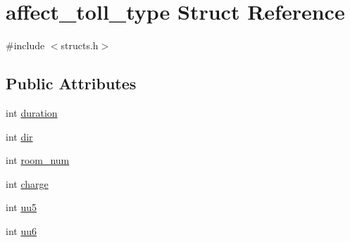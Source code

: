 \hypertarget{structaffect__toll__type}{\section{affect\-\_\-toll\-\_\-type Struct Reference}
\label{structaffect__toll__type}
}


{\ttfamily \#include $<$structs.\-h$>$}

\subsection*{Public Attributes}
\begin{DoxyCompactItemize}
\item 
int \hyperlink{structaffect__toll__type_a7159461554549737b4fcc69d0c99bee6}{duration}
\item 
int \hyperlink{structaffect__toll__type_a9c441d78d4dafead32c1643d3c34887b}{dir}
\item 
int \hyperlink{structaffect__toll__type_a02094b865c39de6b81e98aac186274de}{room\-\_\-num}
\item 
int \hyperlink{structaffect__toll__type_ae30589b5d098548aaeac661c8e5ae3c7}{charge}
\item 
int \hyperlink{structaffect__toll__type_a7e7d65bb8bcd4df59122856581860280}{uu5}
\item 
int \hyperlink{structaffect__toll__type_a7fde23a18f8071a1228a71af20b52c63}{uu6}
\end{DoxyCompactItemize}



